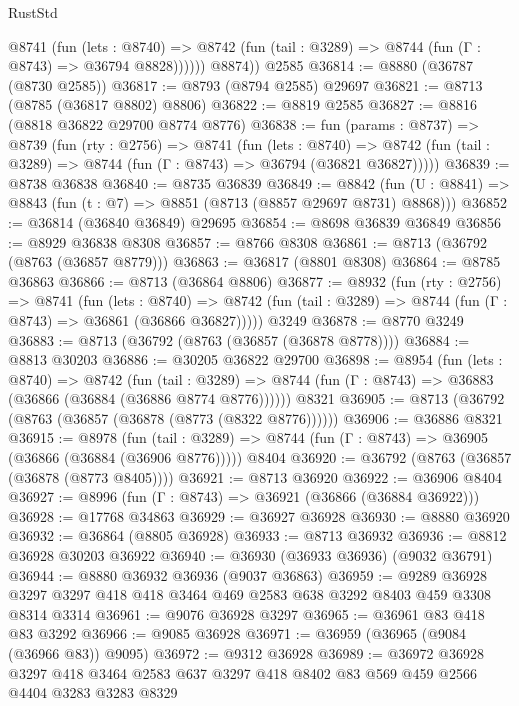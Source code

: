 \begin{lexlean}{RustStd}
\begin{coremodule}
            @8741
              (fun (lets : @8740) =>
              @8742 (fun (tail : @3289) => @8744 (fun (Γ : @8743) => @36794 @8828))))))
        @8874))
    @2585
@36814 := @8880 (@36787 (@8730 @2585))
@36817 := @8793 (@8794 @2585) @29697
@36821 := @8713 (@8785 (@36817 @8802) @8806)
@36822 := @8819 @2585
@36827 := @8816 (@8818 @36822 @29700 @8774 @8776)
@36838 := fun (params : @8737) =>
  @8739
    (fun (rty : @2756) =>
    @8741
      (fun (lets : @8740) =>
      @8742 (fun (tail : @3289) => @8744 (fun (Γ : @8743) => @36794 (@36821 @36827)))))
@36839 := @8738 @36838
@36840 := @8735 @36839
@36849 := @8842
    (fun (U : @8841) => @8843 (fun (t : @7) => @8851 (@8713 (@8857 @29697 @8731) @8868)))
@36852 := @36814 (@36840 @36849) @29695
@36854 := @8698 @36839 @36849
@36856 := @8929 @36838 @8308
@36857 := @8766 @8308
@36861 := @8713 (@36792 (@8763 (@36857 @8779)))
@36863 := @36817 (@8801 @8308)
@36864 := @8785 @36863
@36866 := @8713 (@36864 @8806)
@36877 := @8932
    (fun (rty : @2756) =>
    @8741
      (fun (lets : @8740) =>
      @8742 (fun (tail : @3289) => @8744 (fun (Γ : @8743) => @36861 (@36866 @36827)))))
    @3249
@36878 := @8770 @3249
@36883 := @8713 (@36792 (@8763 (@36857 (@36878 @8778))))
@36884 := @8813 @30203
@36886 := @30205 @36822 @29700
@36898 := @8954
    (fun (lets : @8740) =>
    @8742
      (fun (tail : @3289) =>
      @8744 (fun (Γ : @8743) => @36883 (@36866 (@36884 (@36886 @8774 @8776))))))
    @8321
@36905 := @8713 (@36792 (@8763 (@36857 (@36878 (@8773 (@8322 @8776))))))
@36906 := @36886 @8321
@36915 := @8978
    (fun (tail : @3289) => @8744 (fun (Γ : @8743) => @36905 (@36866 (@36884 (@36906 @8776)))))
    @8404
@36920 := @36792 (@8763 (@36857 (@36878 (@8773 @8405))))
@36921 := @8713 @36920
@36922 := @36906 @8404
@36927 := @8996 (fun (Γ : @8743) => @36921 (@36866 (@36884 @36922)))
@36928 := @17768 @34863
@36929 := @36927 @36928
@36930 := @8880 @36920
@36932 := @36864 (@8805 @36928)
@36933 := @8713 @36932
@36936 := @8812 @36928 @30203 @36922
@36940 := @36930 (@36933 @36936) (@9032 @36791)
@36944 := @8880 @36932 @36936 (@9037 @36863)
@36959 := @9289
    @36928
    @3297
    @3297
    @418
    @418
    @3464
    @469
    @2583
    @638
    @3292
    @8403
    @459
    @3308
    @8314
    @3314
@36961 := @9076 @36928 @3297
@36965 := @36961 @83 @418 @83 @3292
@36966 := @9085 @36928
@36971 := @36959 (@36965 (@9084 (@36966 @83)) @9095)
@36972 := @9312 @36928
@36989 := @36972
    @36928
    @3297
    @418
    @3464
    @2583
    @637
    @3297
    @418
    @8402
    @83
    @569
    @459
    @2566
    @4404
    @3283
    @3283
    @8329

\end{coremodule}
\end{lexlean}

